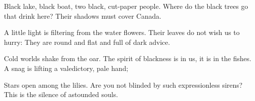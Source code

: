 \documentclass[12pt, letterpaper]{report}
\begin{document}
\author{Sylvia Plath}

\begin{poem}
\begin{stanza}
Black lake, black boat, two black, cut-paper people.\verseline
Where do the black trees go that drink here?\verseline
Their shadows must cover Canada.
\end{stanza}
\begin{stanza}
A little light is filtering from the water flowers.\verseline
Their leaves do not wish us to hurry:\verseline
They are round and flat and full of dark advice.
\end{stanza}
\begin{stanza}
Cold worlds shake from the oar.\verseline
The spirit of blackness is in us, it is in the fishes.\verseline
A snag is lifting a valedictory, pale hand;
\end{stanza}
\begin{stanza}
Stars open among the lilies.\verseline
Are you not blinded by such expressionless sirens?\verseline
This is the silence of astounded souls.
\end{stanza}
\end{poem}












  
  
\end{document}
